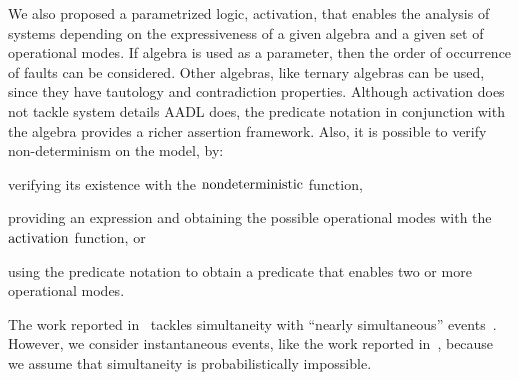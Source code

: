 We also proposed a parametrized logic, \ac{activation}, that enables the analysis of systems depending on the expressiveness of a given algebra and a given set of operational modes.
If \ac{algebra} is used as a parameter, then the order of occurrence of faults can be considered.
Other algebras, like ternary algebras \cite{Jones2016} can be used, since they have tautology and contradiction properties.
Although \ac{activation} does not tackle system details \ac{AADL} does, the predicate notation in conjunction with the \ac{algebra} provides a richer assertion framework.
Also, it is possible to verify non-determinism on the model, by: 
\begin{alineasinline}
  \item verifying its existence with the $\mathrm{nondeterministic}$ function, 
  \item providing an expression and obtaining the possible operational modes with the $\mathrm{activation}$ function, or 
  \item using the predicate notation to obtain a predicate that enables two or more operational modes.
\end{alineasinline}



%
%

\begin{sloppypar}
	The work reported in~\cite{Walker2009,WP2009,WP2010} tackles simultaneity with ``nearly simultaneous'' events~\cite{EWG2013}.
	However, we consider instantaneous events, like the work reported in~\cite{MRL2014}, because we assume that simultaneity is probabilistically impossible.
\end{sloppypar}

